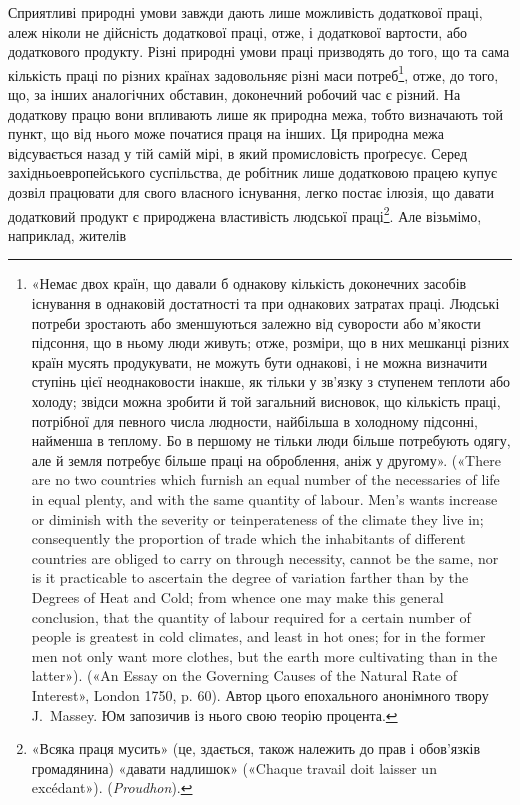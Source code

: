 Сприятливі природні умови завжди дають лише можливість
додаткової праці, алеж ніколи не дійсність додаткової праці,
отже, і додаткової вартости, або додаткового продукту. Різні
природні умови праці призводять до того, що та сама кількість
праці по різних країнах задовольняє різні маси потреб\footnote{
«Немає двох країн, що давали б однакову кількість доконечних
засобів існування в однаковій достатності та при однакових затратах
праці. Людські потреби зростають або зменшуються залежно від суворости
або м’якости підсоння, що в ньому люди живуть; отже, розміри, що в
них мешканці різних країн мусять продукувати, не можуть бути однакові,
і не можна визначити ступінь цієї неоднаковости інакше, як тільки у
зв’язку з ступенем теплоти або холоду; звідси можна зробити й той загальний
висновок, що кількість праці, потрібної для певного числа людности,
найбільша в холодному підсонні, найменша в теплому. Бо в першому
не тільки люди більше потребують одягу, але й земля потребує
більше праці на оброблення, аніж у другому». («There are no two countries
which furnish an equal number of the necessaries of life in equal plenty,
and with the same quantity of labour. Men’s wants increase or diminish
with the severity or teinperateness of the climate they live in; consequently
the proportion of trade which the inhabitants of different countries are
obliged to carry on through necessity, cannot be the same, nor is it practicable
to ascertain the degree of variation farther than by the Degrees of
Heat and Cold; from whence one may make this general conclusion, that
the quantity of labour required for a certain number of people is greatest
in cold climates, and least in hot ones; for in the former men not only want
more clothes, but the earth more cultivating than in the latter»). («An
Essay on the Governing Causes of the Natural Rate of Interest», London
1750, p. 60). Автор цього епохального анонімного твору J.~Massey.
Юм запозичив із нього свою теорію процента.
}, отже,
до того, що, за інших аналогічних обставин, доконечний робочий
час є різний. На додаткову працю вони впливають лише як
природна межа, тобто визначають той пункт, що від нього може
початися праця на інших. Ця природна межа відсувається назад
у тій самій мірі, в який промисловість проґресує. Серед західньоевропейського
суспільства, де робітник лише додатковою працею
купує дозвіл працювати для свого власного існування, легко
постає ілюзія, що давати додатковий продукт є природжена властивість
людської праці\footnote{
«Всяка праця мусить» (це, здається, також належить до прав і
обов’язків громадянина) «давати надлишок» («Chaque travail doit
laisser un excédant»). (\emph{Proudhon}).
}. Але візьмімо, наприклад, жителів
